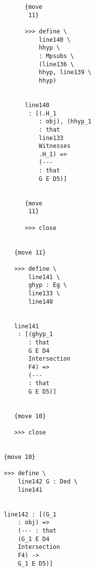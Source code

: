 \documentclass[12pt]{article}
\begin{document}
\begin{verbatim}
                                    {move 
                                     11}

                                    >>> define \
                                        line140 \
                                        hhyp \
                                        : Mpsubs \
                                        (line136 \
                                        hhyp, line139 \
                                        hhyp)


                                    line140 
                                     : [(.H_1 
                                        : obj), (hhyp_1 
                                        : that 
                                        line133 
                                        Witnesses 
                                        .H_1) => 
                                        (--- 
                                        : that 
                                        G E D5)]


                                    {move 
                                     11}

                                    >>> close


                                 {move 11}

                                 >>> define \
                                     line141 \
                                     ghyp : Eg \
                                     line133 \
                                     line140


                                 line141 
                                  : [(ghyp_1 
                                     : that 
                                     G E D4 
                                     Intersection 
                                     F4) => 
                                     (--- 
                                     : that 
                                     G E D5)]


                                 {move 10}

                                 >>> close


                              {move 10}

                              >>> define \
                                  line142 G : Ded \
                                  line141


                              line142 : [(G_1 
                                  : obj) => 
                                  (--- : that 
                                  (G_1 E D4 
                                  Intersection 
                                  F4) -> 
                                  G_1 E D5)]



\end{verbatim}
\end{document}
